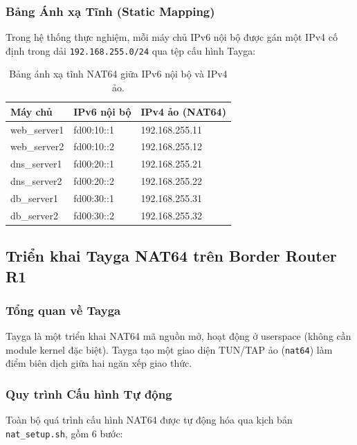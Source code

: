 \subsubsection{Bảng Ánh xạ Tĩnh (Static Mapping)}

Trong hệ thống thực nghiệm, mỗi máy chủ IPv6 nội bộ được gán một IPv4 cố định trong dải \texttt{192.168.255.0/24} qua tệp cấu hình Tayga:

\begin{table}[H]
    \centering
    \caption{Bảng ánh xạ tĩnh NAT64 giữa IPv6 nội bộ và IPv4 ảo.}
    \label{tab:nat64_mapping}
    \begin{tabular}{|l|l|l|}
        \hline
        \textbf{Máy chủ} & \textbf{IPv6 nội bộ} & \textbf{IPv4 ảo (NAT64)} \\
        \hline
        web\_server1 & fd00:10::1 & 192.168.255.11 \\
        \hline
        web\_server2 & fd00:10::2 & 192.168.255.12 \\
        \hline
        dns\_server1 & fd00:20::1 & 192.168.255.21 \\
        \hline
        dns\_server2 & fd00:20::2 & 192.168.255.22 \\
        \hline
        db\_server1 & fd00:30::1 & 192.168.255.31 \\
        \hline
        db\_server2 & fd00:30::2 & 192.168.255.32 \\
        \hline
    \end{tabular}
\end{table}

\subsection{Triển khai Tayga NAT64 trên Border Router R1}

\subsubsection{Tổng quan về Tayga}

Tayga là một triển khai NAT64 mã nguồn mở, hoạt động ở userspace (không cần module kernel đặc biệt). Tayga tạo một giao diện TUN/TAP ảo (\texttt{nat64}) làm điểm biên dịch giữa hai ngăn xếp giao thức.

\subsubsection{Quy trình Cấu hình Tự động}

Toàn bộ quá trình cấu hình NAT64 được tự động hóa qua kịch bản \texttt{nat\_setup.sh}, gồm 6 bước:


